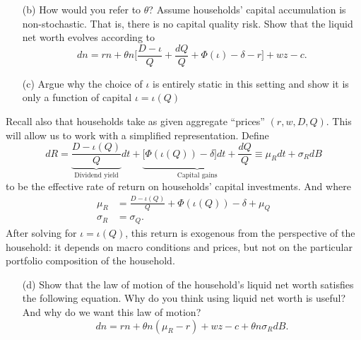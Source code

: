 \documentclass[11pt]{extarticle}
\theoremstyle{plain}
\theoremstyle{definition}
\begin{document}
\begin{enumerate}
\item [(b)] How would you refer to $\theta$? Assume households' capital accumulation is non-stochastic. That is, there is no capital quality risk. Show that the liquid net worth evolves according to 
\begin{equation*}
	dn = rn +  \theta n \bigg[ \frac{D - \iota }{Q} +  \frac{dQ}{Q} + \Phi(\iota) - \delta - r \bigg]  + w z - c .
\end{equation*}
 
\item [(c)] Argue why the choice of $\iota$ is entirely static in this setting and show it is only a function of capital $\iota = \iota(Q)$ 
\end{enumerate}


\vspace{5mm}
\noindent
Recall also that households take as given aggregate ``prices'' $(r, w, D, Q)$.  This will allow us to work with a simplified representation. Define 
\begin{equation*}
	dR = \underbrace{\frac{D - \iota (Q) }{Q}}_\text{Dividend yield} dt + \underbrace{\Big[\Phi(\iota(Q)) - \delta \Big] dt +  \frac{dQ}{Q}}_\text{Capital gains} \equiv \mu_R dt + \sigma_R dB
\end{equation*}
to be the effective rate of return on households' capital investments. And where
\begin{align*}
	\mu_R &= \frac{D - \iota (Q) }{Q}  + \Phi(\iota(Q)) - \delta + \mu_Q \\
	\sigma_R &= \sigma_Q. 
\end{align*}
After solving for $\iota = \iota(Q)$, this return is exogenous from the perspective of the household: it depends on macro conditions and prices, but not on the particular portfolio composition of the household.


\begin{enumerate}
\item [(d)] Show that the law of motion of the household's liquid net worth satisfies the following equation. Why do you think using liquid net worth is useful? And why do we want this law of motion?
\begin{equation*}
	dn = rn + \theta n (\mu_R - r) + wz - c + \theta n \sigma_R dB. 
\end{equation*}
\end{enumerate}
\end{document}
